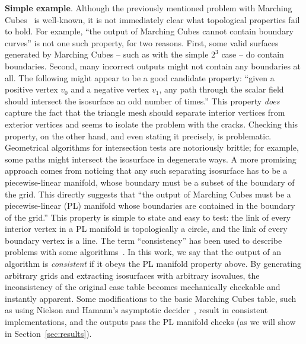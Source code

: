 \textbf{Simple example}. Although the previously mentioned problem
with Marching Cubes~\cite{lor87} is well-known, it is not
immediately clear what topological properties
fail to hold. For example, ``the output of Marching Cubes cannot
contain boundary curves'' is not one such property, for two
reasons. First, some valid surfaces generated by Marching Cubes --
such as with the simple $2^3$ case -- do contain boundaries. Second,
many incorrect outputs might not contain any boundaries at all. The
following might appear to be a good candidate property: ``given a
positive vertex $v_0$ and a negative vertex $v_1$, any path through
the scalar field should intersect the isosurface an odd number of
times.'' This property \emph{does} capture the fact that the triangle
mesh should separate interior vertices from exterior vertices and
seems to isolate the problem with the cracks. Checking this property,
on the other hand, and even stating it precisely, is
problematic. Geometrical algorithms for intersection tests are
notoriously brittle; for example, some paths might intersect the
isosurface in degenerate ways.  A more promising approach comes from
noticing that any such separating isosurface has to be a piecewise-linear
manifold, whose boundary must be a subset of the boundary of the
grid. This directly suggests that ``the output of Marching Cubes must
be a piecewise-linear (PL) manifold whose boundaries are contained in
the boundary of the grid.''  This property is simple to state and easy
to test: the link of every interior vertex in a PL manifold is
topologically a circle, and the link of every boundary vertex is a
line.
%
The term ``consistency'' has been used to describe problems with some
algorithms~\cite{newman:candg:2006}. In this work, we say that the
output of an algorithm is \emph{consistent} if it obeys the PL
manifold property above.  By generating arbitrary grids and extracting
isosurfaces with arbitrary isovalues, the inconsistency of the
original case table becomes mechanically checkable and instantly
apparent.
%
Some modifications to the basic Marching Cubes table, such as using
Nielson and Hamann's asymptotic decider~\cite{Nielson:1991:ADR:949607.949621}, result in
consistent implementations, and the outputs pass the PL manifold
checks (as we will show in Section~\ref{sec:results}).


